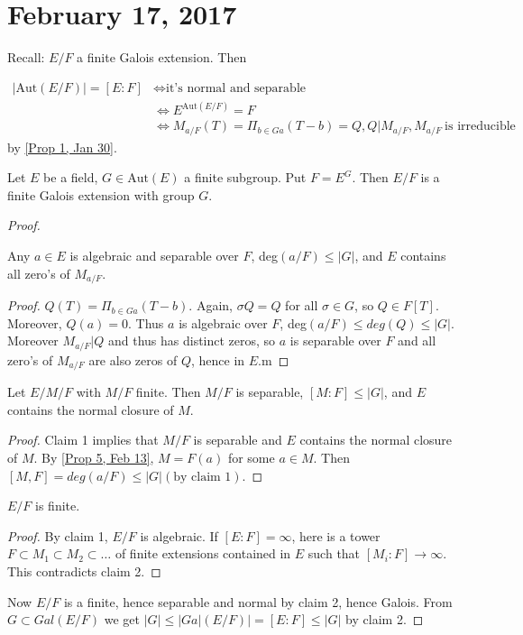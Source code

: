 \section{February 17, 2017}

\noindent Recall: $E/F$ a finite Galois extension. Then 

\begin{align*}
|\text{Aut}(E/F)|=[E:F] &\iff \text{it's normal and separable} \\
&\iff E^{\text{Aut}(E/F)}=F \\
&\iff M_{a/F}(T)=\Pi_{b\in Ga}(T-b)=Q, Q|M_{a/F},M_{a/F}\ \text{is irreducible}
\end{align*}
by \ref{Prop 1, Jan 30}.

\begin{prop} \label{Prop 1, Feb 17}
Let $E$ be a field, $G\in \text{Aut}(E)$ a finite subgroup. Put $F=E^G$. Then $E/F$ is a finite Galois extension with group $G$.
\end{prop}
\begin{proof}
\begin{claim}
Any $a\in E$ is algebraic and separable over $F$, deg$(a/F)\leq |G|$, and $E$ contains all zero's of $M_{a/F}$.
\end{claim}
\begin{proof}
$Q(T)=\Pi_{b\in Ga}(T-b)$. Again, $\sigma Q=Q$ for all $\sigma\in G$, so $Q\in F[T]$. Moreover, $Q(a)=0$. Thus $a$ is algebraic over $F$, deg$(a/F)\leq deg(Q)\leq |G|$. Moreover $M_{a/F}|Q$ and thus has distinct zeros, so $a$ is separable over $F$ and all zero's of $M_{a/F}$ are also zeros of $Q$, hence in $E$.m
\end{proof}
\begin{claim}
Let $E/M/F$ with $M/F$ finite. Then $M/F$ is separable, $[M:F]\leq |G|$, and $E$ contains the normal closure of $M$.
\end{claim}
\begin{proof}
Claim 1 implies that $M/F$ is separable and $E$ contains the normal closure of $M$. By \ref{Prop 5, Feb 13}, $M=F(a)$ for some $a\in M$. Then $[M,F]=deg(a/F)\leq |G| (\text{by claim 1}).$
\end{proof}
\begin{claim}
$E/F$ is finite.
\end{claim}
\begin{proof}
By claim 1, $E/F$ is algebraic. If $[E:F]=\infty$, here is a tower $F\subset M_1\subset M_2\subset\ldots$ of finite extensions contained in $E$ such that $[M_i:F]\longrightarrow\infty$. This contradicts claim 2.
\end{proof}
Now $E/F$ is a finite, hence separable and normal by claim 2, hence Galois. From $G\subset Gal(E/F)$ we get $|G|\leq |Ga|(E/F)|=[E:F]\leq |G|$ by claim 2.
\end{proof}
